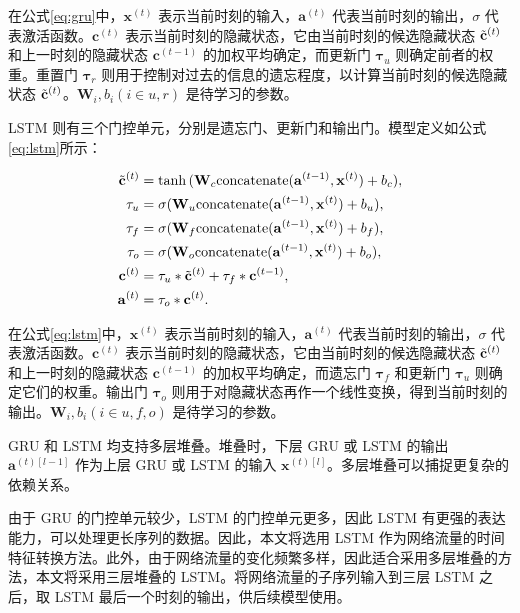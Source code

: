 {在公式\eqref{eq:gru}中，$\mathbf{x}^{(t)}$ 表示当前时刻的输入，$\mathbf{a}^{(t)}$ 代表当前时刻的输出，$\sigma$ 代表激活函数。$\mathbf{c}^{(t)}$ 表示当前时刻的隐藏状态，它由当前时刻的候选隐藏状态 $\Tilde{\mathbf{c}}^{(t)}$ 和上一时刻的隐藏状态 $\mathbf{c}^{(t-1)}$ 的加权平均确定，而更新门 $\mathbf{\tau}_u$ 则确定前者的权重。重置门 $\mathbf{\tau}_r$ 则用于控制对过去的信息的遗忘程度，以计算当前时刻的候选隐藏状态 $\Tilde{\mathbf{c}}^{(t)}$。$\mathbf{W}_i, b_i (i \in {u, r})$ 是待学习的参数。

LSTM 则有三个门控单元，分别是遗忘门、更新门和输出门。模型定义如公式\eqref{eq:lstm}所示：

\begin{equation}
    \label{eq:lstm}
    \begin{split}
        \Tilde{\mathbf{c}}^{(t)} &= \tanh{(\mathbf{W}_c \mathrm{concatenate}(\mathbf{a}^{(t-1)},\mathbf{x}^{(t)}) + b_c)} ,\\
        \mathbf{\tau}_u &= \sigma{(\mathbf{W}_u \mathrm{concatenate}(\mathbf{a}^{(t-1)},\mathbf{x}^{(t)}) + b_u)} ,\\
        \mathbf{\tau}_f &= \sigma{(\mathbf{W}_f \mathrm{concatenate}(\mathbf{a}^{(t-1)},\mathbf{x}^{(t)}) + b_f)} ,\\
        \mathbf{\tau}_o &= \sigma{(\mathbf{W}_o \mathrm{concatenate}(\mathbf{a}^{(t-1)},\mathbf{x}^{(t)}) + b_o)} ,\\
        \mathbf{c}^{(t)} &= \mathbf{\tau}_u \ast \Tilde{\mathbf{c}}^{(t)} + \mathbf{\tau}_f \ast \mathbf{c}^{(t-1)} ,\\
        \mathbf{a}^{(t)} &= \mathbf{\tau}_o \ast \mathbf{c}^{(t)}.
    \end{split}
\end{equation}

在公式\eqref{eq:lstm}中，$\mathbf{x}^{(t)}$ 表示当前时刻的输入，$\mathbf{a}^{(t)}$ 代表当前时刻的输出，$\sigma$ 代表激活函数。$\mathbf{c}^{(t)}$ 表示当前时刻的隐藏状态，它由当前时刻的候选隐藏状态 $\Tilde{\mathbf{c}}^{(t)}$ 和上一时刻的隐藏状态 $\mathbf{c}^{(t-1)}$ 的加权平均确定，而遗忘门 $\mathbf{\tau}_f$ 和更新门 $\mathbf{\tau}_u$ 则确定它们的权重。输出门 $\mathbf{\tau}_o$ 则用于对隐藏状态再作一个线性变换，得到当前时刻的输出。$\mathbf{W}_i, b_i (i \in {u, f, o})$ 是待学习的参数。

GRU 和 LSTM 均支持多层堆叠。堆叠时，下层 GRU 或 LSTM 的输出 $\mathbf{a}^{(t)\left[l-1\right]}$ 作为上层 GRU 或 LSTM 的输入 $\mathbf{x}^{(t)\left[l\right]}$。多层堆叠可以捕捉更复杂的依赖关系。

由于 GRU 的门控单元较少，LSTM 的门控单元更多，因此 LSTM 有更强的表达能力，可以处理更长序列的数据。因此，本文将选用 LSTM 作为网络流量的时间特征转换方法。此外，由于网络流量的变化频繁多样，因此适合采用多层堆叠的方法，本文将采用三层堆叠的 LSTM。将网络流量的子序列输入到三层 LSTM 之后，取 LSTM 最后一个时刻的输出，供后续模型使用。

}
